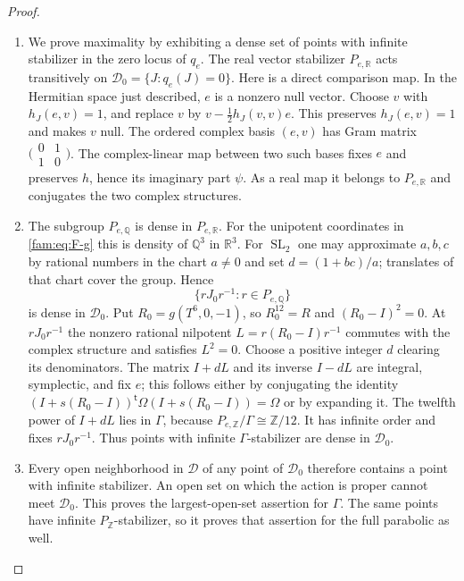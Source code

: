 \begin{proof}
\begin{enumerate}[label=\arabic*.,leftmargin=*]
\item We prove maximality by exhibiting a dense set of points with infinite
stabilizer in the zero locus of $q_e$.
The real vector stabilizer $P_{e,\mathbb R}$ acts transitively on
$\mathcal D_0=\{J:q_e(J)=0\}$.  Here is a direct comparison map.  In the
Hermitian space just described, $e$ is a nonzero null vector.  Choose
$v$ with $h_J(e,v)=1$, and replace $v$ by
$v-\tfrac12h_J(v,v)e$.  This preserves $h_J(e,v)=1$ and makes $v$ null.
The ordered complex basis $(e,v)$ has Gram matrix
$\bigl(\begin{smallmatrix}0&1\\1&0\end{smallmatrix}\bigr)$.
The complex-linear map between two such bases fixes $e$ and preserves
$h$, hence its imaginary part $\psi$.  As a real map it belongs to
$P_{e,\mathbb R}$ and conjugates the two complex structures.

\item The subgroup $P_{e,\mathbb Q}$ is dense in $P_{e,\mathbb R}$.
For the unipotent coordinates in \eqref{fam:eq:F-g} this is density of
$\mathbb Q^3$ in $\mathbb R^3$.  For $\operatorname{SL}_2$ one may
approximate $a,b,c$ by rational numbers in the chart $a\ne0$ and set
$d=(1+bc)/a$; translates of that chart cover the group.  Hence
\[
 \{rJ_0r^{-1}:r\in P_{e,\mathbb Q}\}
\]
is dense in $\mathcal D_0$.
Put $R_0=g(T^6,0,-1)$, so $R_0^{12}=R$ and
$(R_0-I)^2=0$.  At $rJ_0r^{-1}$ the nonzero rational nilpotent
$L=r(R_0-I)r^{-1}$ commutes with the complex structure and satisfies
$L^2=0$.  Choose a positive integer $d$ clearing its denominators.
The matrix $I+dL$ and its inverse $I-dL$ are integral, symplectic, and
fix $e$; this follows either by conjugating the identity
$(I+s(R_0-I))^{\mathsf t}\Omega(I+s(R_0-I))=\Omega$ or by expanding it.
The twelfth power of $I+dL$ lies in $\Gamma$, because
$P_{e,\mathbb Z}/\Gamma\cong\mathbb Z/12$.  It has infinite order and
fixes $rJ_0r^{-1}$.  Thus points with infinite $\Gamma$-stabilizer are
dense in $\mathcal D_0$.

\item Every open neighborhood in $\mathcal D$ of any point of $\mathcal D_0$
therefore contains a point with infinite stabilizer.  An open set on
which the action is proper cannot meet $\mathcal D_0$.  This proves the
largest-open-set assertion for $\Gamma$.  The same points have infinite
$P_{\mathbb Z}$-stabilizer, so it proves that assertion for the full
parabolic as well.
\end{enumerate}
\end{proof}

